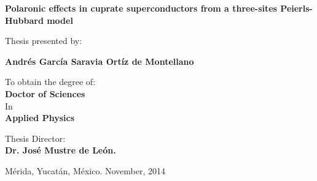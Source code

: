 \bs\bs\bs\bs
\begin{center}
  {\large \bf \bs \bf 
    \hspace{-2.8cm}
    \textsf{Polaronic effects in cuprate superconductors from a three-sites Peierls-Hubbard model}}
\end{center}
\bs\bs\bs
\begin{center}
  {\large 
    \hspace{-2.8cm}
    \textsf{Thesis presented by:}}
\end{center}
\bs\bs
\begin{center}
  {\large \bf 
    \hspace{-2.8cm}
    \textsf{Andrés García Saravia Ortíz de Montellano}} 
\end{center}
\bs
\begin{center} 
  {\large 
    \hspace{-2.8cm}
    \textsf{To obtain the degree of:}} \\ 
  \bs \smallskip 
  {\large \bf 
    \hspace{-2.8cm}
    \textsf{Doctor of Sciences}}\\ 
  \bs 
  {\large 
    \hspace{-2.8cm}
    \textsf{In}} \\
  \bs
  {\bf \large 
    \hspace{-2.8cm}
    \textsf{Applied Physics}}
\end{center}
\bs\bs\bs
\begin{center}
  \large{\hspace{-2.8cm}
    \textsf{Thesis Director: \\
      \smallskip 
      \hspace{-2.8cm}
      \textbf{Dr. José Mustre de León.}}} \\
\end{center}
\bs\bs\bs\bs\bs\bs\bs
\begin{center}
  {\large 
    \hspace{-2.8cm}
    \textsf{Mérida, Yucatán, México.
      \hspace{5.3cm} November, 2014}}
\end{center}
